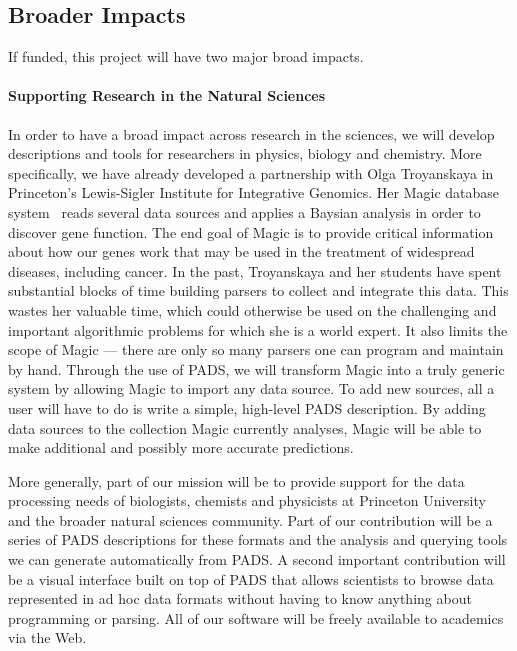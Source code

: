 \documentclass[11pt]{article}
\begin{document}
\subsection{Broader Impacts}
\label{ssec:impact}

If funded, this project will have two major broad impacts.

\paragraph*{Supporting Research in the Natural Sciences}
In order to have a broad impact across research in the sciences,
we will develop descriptions and tools for researchers in
physics, biology and chemistry.
More specifically, we have already developed a partnership with
Olga Troyanskaya in Princeton's Lewis-Sigler Institute for 
Integrative Genomics.  Her Magic database system~\cite{magic}
reads several data sources
and applies a Baysian analysis in order to discover gene function.
The end goal of Magic is to provide critical information about how
our genes work that may be used in the treatment of widespread diseases,
including cancer.
In the past, Troyanskaya and her students have spent
substantial blocks of time building parsers to collect and integrate
this data.  This wastes her valuable time, which could otherwise be
used on the challenging and important algorithmic problems for which
she is a world expert.  It also limits the scope of Magic --- there are
only so many parsers one can program and maintain by hand.
Through the use of PADS, we will transform Magic into a truly generic
system by allowing Magic to import any data source.  To add new sources,
all a user will have to do is write a simple, high-level PADS description.
By adding data sources to the collection Magic
currently analyses, Magic will be able to make additional and possibly more
accurate predictions.

More generally, part of our mission will be
to provide support for the data processing needs of biologists,
chemists and physicists at Princeton University and 
the broader natural sciences community.  
Part of our contribution will be a series of PADS
descriptions for these formats and the analysis and querying tools we
can generate automatically from PADS.  A second important contribution
will be a visual interface built on top of PADS that allows scientists
to browse data represented in ad hoc data formats without having to
know anything about programming or parsing.  All of our software will
be freely available to academics via the Web.
\end{document}

